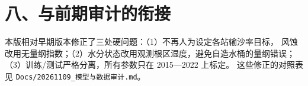 \documentclass[11pt,a4paper]{ctexart}
\begin{document}
\section*{八、与前期审计的衔接}
本版相对早期版本修正了三处硬问题：（1）不再人为设定各站输沙率目标，
风蚀改用无量纲指数；（2）水分状态改用观测根区湿度，避免自造水桶的量纲错误；
（3）训练/测试严格分离，所有参数只在 2015—2022 上标定。
这些修正的对照表见 \texttt{Docs/20261109\_模型与数据审计.md}。
\end{document}
